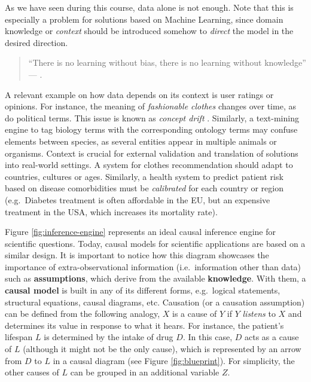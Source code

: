 \documentclass[
  12pt,
]{book}
\begin{document}
As we have seen during this course, data alone is not enough. Note that this is especially a problem for solutions based on Machine Learning, since domain knowledge or \emph{context} should be introduced somehow to \emph{direct} the model in the desired direction.

\begin{quote}
``There is no learning without bias, there is no learning without knowledge'' --- \citep{skansi2020guide} \citep{domingos2015master}.
\end{quote}

A relevant example on how data depends on its context is user ratings or opinions. For instance, the meaning of \emph{fashionable clothes} changes over time, as do political terms. This issue is known as \emph{concept drift} \citep{kubat2017introduction}. Similarly, a text-mining engine to tag biology terms with the corresponding ontology terms may confuse elements between species, as several entities appear in multiple animals or organisms. Context is crucial for external validation and translation of solutions into real-world settings. A system for clothes recommendation should adapt to countries, cultures or ages. Similarly, a health system to predict patient risk based on disease comorbidities must be \emph{calibrated} for each country or region (e.g.~Diabetes treatment is often affordable in the EU, but an expensive treatment in the USA, which increases its mortality rate).

Figure \ref{fig:inference-engine} represents an ideal causal inference engine for scientific questions. Today, causal models for scientific applications are based on a similar design. It is important to notice how this diagram showcases the importance of extra-observational information (i.e.~information other than data) such as \textbf{assumptions}, which derive from the available \textbf{knowledge}. With them, a \textbf{causal model} is built in any of its different forms, e.g.~logical statements, structural equations, causal diagrams, etc. Causation (or a causation assumption) can be defined from the following analogy, \(X\) is a cause of \(Y\) if \(Y\) \emph{listens} to \(X\) and determines its value in response to what it hears. For instance, the patient's lifespan \(L\) is determined by the intake of drug \(D\). In this case, \(D\) acts as a cause of \(L\) (although it might not be the only cause), which is represented by an arrow from \(D\) to \(L\) in a causal diagram (see Figure \ref{fig:blueprint}). For simplicity, the other causes of \(L\) can be grouped in an additional variable \(Z\).
\end{document}
